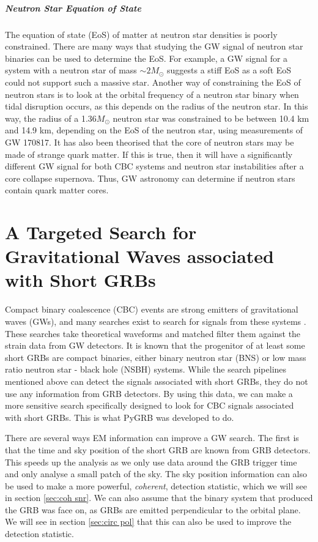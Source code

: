 \documentclass[11pt]{cuthesis}
\begin{document}
\paragraph{Neutron Star Equation of State}
The equation of state (EoS) of matter at neutron star densities is poorly constrained. There are many ways that studying the GW signal of neutron star binaries can be used to determine the EoS. For example, a GW signal for a system with a neutron star of mass $\sim 2M_\odot$ suggests a stiff EoS as a soft EoS could not support such a massive star. \cite{Nice:2005fi} Another way of constraining the EoS of neutron stars is to look at the orbital frequency of a neutron star binary when tidal disruption occurs, as this depends on the radius of the neutron star. In this way, the radius of a 1.36$M_\odot$ neutron star was constrained to be between 10.4 km and 14.9 km, depending on the EoS of the neutron star, using measurements of GW 170817. \cite{170817_pe} It has also been theorised that the core of neutron stars may be made of strange quark matter. If this is true, then it will have a significantly different GW signal for both CBC systems \cite{Lattimer:2006xb} and neutron star instabilities after a core collapse supernova. Thus, GW astronomy can determine if neutron stars contain quark matter cores. 


\chapter{A Targeted Search for Gravitational Waves associated with Short GRBs} \label{chap: CBC}
Compact binary coalescence (CBC) events are strong emitters of gravitational waves (GWs), and many searches exist to search for signals from these systems \cite{pycbc_Usman:2015, gstlal_Sachdev:2019, gstlal_messick}. These searches take theoretical waveforms \cite{phenom_Khan:2015} and matched filter them against the strain data from GW detectors. It is known that the progenitor of at least some short GRBs are compact binaries, either binary neutron star (BNS) or low mass ratio neutron star - black hole (NSBH) systems. While the search pipelines mentioned above can detect the signals associated with short GRBs, they do not use any information from GRB detectors. By using this data, we can make a more sensitive search specifically designed to look for CBC signals associated with short GRBs. This is what PyGRB was developed to do.

There are several ways EM information can improve a GW search. The first is that the time and sky position of the short GRB are known from GRB detectors. This speeds up the analysis as we only use data around the GRB trigger time and only analyse a small patch of the sky. The sky position information can also be used to make a more powerful, \textit{coherent}, detection statistic, \cite{coh1,coh2,coh3,coh4,coh5} which we will see in section \ref{sec:coh snr}. We can also assume that the binary system that produced the GRB was face on, as GRBs are emitted perpendicular to the orbital plane. We will see in section \ref{sec:circ pol} that this can also be used to improve the detection statistic.  
\end{document}
